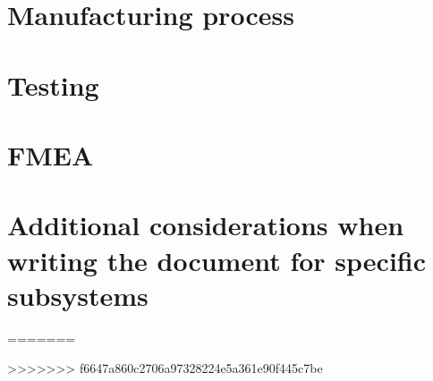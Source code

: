 \section{Manufacturing process}

\section{Testing}

\section{FMEA}

\section{Additional considerations when writing the document for specific subsystems}

=======

>>>>>>> f6647a860c2706a97328224e5a361e90f445c7be






\newpage






\newpage
